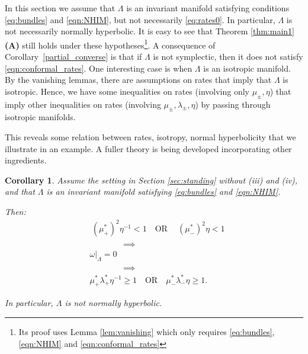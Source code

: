 \documentclass[11pt]{amsart}
\newtheorem{cor}[thm]{Corollary}
\theoremstyle{definition}
\theoremstyle{remark}
\numberwithin{equation}{section}
\begin{document}
In this section we assume that $\Lambda$ is an invariant manifold satisfying conditions \eqref{eq:bundles} and \eqref{eqn:NHIM}, but not necessarily \ref{eq:rates0}.
In particular, $\Lambda$ is not necessarily normally hyperbolic. It is easy to see that Theorem \ref{thm:main1} {\bf(A)} still holds under these hypotheses\footnote{Its proof uses Lemma \ref{lem:vanishing} which only requires \eqref{eq:bundles}, \eqref{eqn:NHIM} and \eqref{eqn:conformal_rates}}.
A  consequence  of Corollary~\ref{partial_converse} is
that if  $\Lambda$ is not symplectic,
then it does not satisfy \eqref{eqn:conformal_rates}.
One interesting case is when $\Lambda$ is an isotropic manifold.
By the vanishing lemmas, there are assumptions on
rates that imply that $\Lambda$ is  isotropic. Hence, we have
some inequalities on rates (involving only $\mu_\pm, \eta$) that imply other inequalities on rates
(involving $\mu_\pm, \lambda_\pm, \eta$)
by passing through isotropic manifolds.

This reveals some relation between rates, isotropy, normal hyperbolicity
that we illustrate in an example. A fuller theory is being developed
incorporating other ingredients.



\begin{cor}
Assume the setting in Section \ref{sec:standing} without (iii) and (iv), and that  $\Lambda$ is an invariant manifold satisfying \eqref{eq:bundles} and \eqref{eqn:NHIM}.

  Then:
  \begin{equation}
    \label{corrates}
    \begin{split}
      &   \ (\mu_+^* )^2 \eta^{-1} < 1   \quad  \textrm{OR} \quad
       \ (\mu_-^* )^2 \eta < 1  \\
      & \phantom{AAAAA} \implies \\
      & \omega|_\Lambda = 0 \\
      & \phantom{AAAAA} \implies \\
      &   \mu_+^* \lambda_+^*  \eta^{-1} \ge 1    \quad \textrm{OR} \quad
       \mu_-^*  \lambda_-^* \eta \ge 1.
    \end{split}
  \end{equation}

In particular, $\Lambda$ is not normally hyperbolic.
\end{cor}
\end{document}
